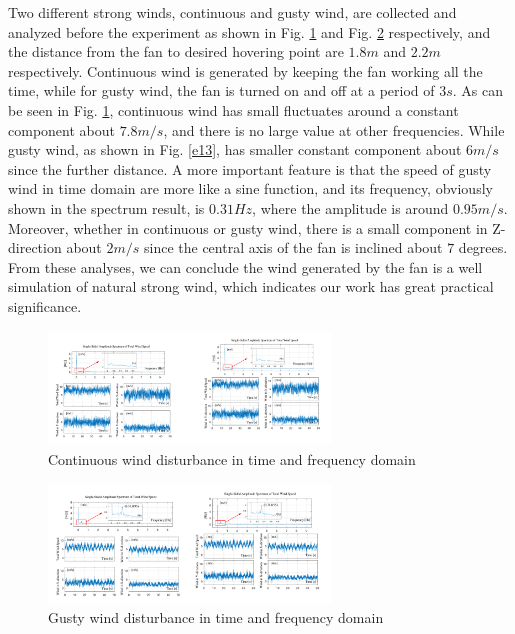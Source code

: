 \documentclass[letterpaper, 10 pt, conference]{ieeeconf}  %
\begin{document}
Two different strong winds, continuous and gusty wind, are collected and analyzed before the experiment as shown in Fig. \ref{f12} and Fig. \ref{f13} respectively, and the distance from the fan to desired hovering point are $1.8m$ and $2.2m$ respectively.
Continuous wind is generated by keeping the fan working all the time, while for gusty wind, the fan is turned on and off at a period of $3s$.
As can be seen in Fig. \ref{f12}, continuous wind has small fluctuates around a constant component about $7.8m/s$, and there is no large value at other frequencies.
While gusty wind, as shown in Fig. \ref{e13}, has smaller constant component about $6m/s$ since the further distance.
A more important feature is that the speed of gusty wind in time domain are more like a sine function, and its frequency, obviously shown in the spectrum result, is $0.31Hz$, where the amplitude is around $0.95m/s$.
Moreover, whether in continuous or gusty wind, there is a small component in Z-direction about $2m/s$ since the central axis of the fan is inclined about $7$ degrees.
From these analyses, we can conclude the wind generated by the fan is a well simulation of natural strong wind, which indicates our work has great practical significance.
\begin{figure}[t]
    \centering
    \includegraphics[width=2.95in]{illustrations/fig12.pdf}
    \caption{Continuous wind disturbance in time and frequency domain}
    \label{f12}
\end{figure}
\begin{figure}[t]
    \centering
    \includegraphics[width=2.95in]{illustrations/fig13.pdf}
    \caption{Gusty wind disturbance in time and frequency domain}
    \label{f13}
\end{figure}
\end{document}
